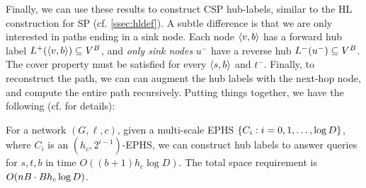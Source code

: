 Finally, we can use these results to construct CSP hub-labels, similar to the HL construction for SP (cf. \cref{ssec:hldef}).
A subtle difference is that we are only interested in paths ending in a sink node.
Each node $\pp{v,b}$ has a forward hub label $\Lf(\pp{v,b})\subseteq V^B$, and \emph{only sink nodes} $u^-$ have a reverse hub $\Lb(u^-)\subseteq V^B$.
The cover property must be satisfied for every $\pp{s,b}$ and $t^-$.
Finally, to reconstruct the path, we can can augment the hub labels with the next-hop node, and compute the entire path recursively.
Putting things together, we have the following (cf. \cite{TechReport} for details):

\begin{theorem}
	\label{theo:HLeff}
	For a network $(G,\ell,c)$, given a multi-scale EPHS $\crl*{C_i:i=0,1,\ldots,\log D}$, where $C_i$ is an $(h_c,2^{i-1})$-EPHS, we can construct hub labels 
	to answer queries for $s,t,b$ in time $O((b+1) h_c\log D)$.
	The total space requirement is $\Or(nB \cdot Bh_c\log D)$.
\end{theorem}

%
%


